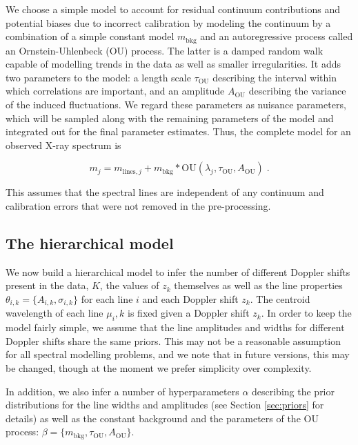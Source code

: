 \documentclass[12pt]{emulateapj}
\newcommand{\pars}{\theta}
\newcommand{\mean}{m}
\newcommand{\bkg}{\mathrm{bkg}}
\begin{document}
We choose a simple model to account for residual continuum contributions and potential biases due to incorrect calibration by modeling the continuum by a combination of a simple constant model $\mean_{\mathrm{bkg}}$ and an autoregressive process called an Ornstein-Uhlenbeck (OU) process. The latter is a damped random walk capable of modelling trends in the data as well as smaller irregularities. It adds two parameters to the model: a length scale $\tau_{\mathrm{OU}}$ describing the interval within which correlations are important, and an amplitude $A_{\mathrm{OU}}$ describing the variance of the induced fluctuations. 
We regard these parameters as nuisance parameters, which will be sampled along with the remaining parameters of the model and integrated out for the final parameter estimates. 
Thus, the complete model for an observed X-ray spectrum is

\begin{equation}
\label{eqn:modelflux}
m_j = m_{\mathrm{lines},j} + m_{\mathrm{bkg}}*\mathrm{OU}(\lambda_j, \tau_{\mathrm{OU}}, A_{\mathrm{OU}}) \; .
\end{equation}

\noindent This assumes that the spectral lines are independent of any continuum and calibration errors that were not removed in the pre-processing. 

\subsection{The hierarchical model}

We now build a hierarchical model to infer the number of different Doppler shifts present in the data, $K$, the values of $z_k$ themselves as well as the line properties ${\pars_{i,k}} = \{A_{i,k}, \sigma_{i,k}\}$ for each line $i$ and each Doppler shift $z_k$. The centroid wavelength of each line $\mu_i,k$ is fixed given a Doppler shift $z_k$. In order to keep the model fairly simple, we assume that the line amplitudes and widths for different Doppler shifts share the same priors. This may not be a reasonable assumption for all spectral modelling problems, and we note that in future versions, this may be changed, though at the moment we prefer simplicity over complexity. 

In addition, we also infer a number of hyperparameters $\alpha$ describing the prior distributions for the line widths and amplitudes (see Section \ref{sec:priors} for details) as well as the constant background and the parameters of the OU process: $\beta = \{\mean_{\bkg}, \tau_{\mathrm{OU}}, A_{\mathrm{OU}}\}$.
\end{document}
